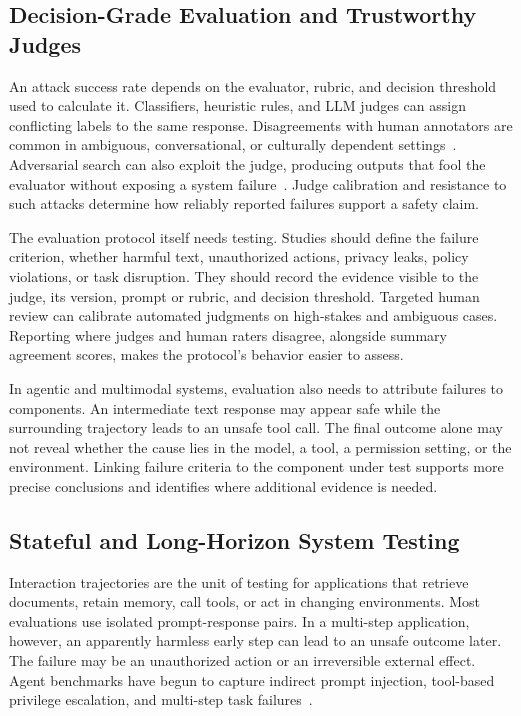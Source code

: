 \documentclass[review]{fcs}
\let\fcsOriginalCite\cite
\renewcommand{\cite}[1]{\allowbreak\fcsOriginalCite{#1}}
\begin{document}
\subsection{Decision-Grade Evaluation and Trustworthy Judges}
\label{sec:agenda_judges}

An attack success rate depends on the evaluator, rubric, and decision threshold used to calculate it. Classifiers, heuristic rules, and LLM judges can assign conflicting labels to the same response. Disagreements with human annotators are common in ambiguous, conversational, or culturally dependent settings~\cite{souly2024strongreject,han2024wildguard,inan2023llamaguard,zheng2023mtbench,chen2024humansjudge,thakur2025judgingjudges,chen2025saferluckier,eiras2025knowthyjudge,NEURIPS2023_a74b697b,mostafazadeh-davani-etal-2024-d3code}. Adversarial search can also exploit the judge, producing outputs that fool the evaluator without exposing a system failure~\cite{raina2024robustjudge,tong2025badjudge,shi2024optimization}. Judge calibration and resistance to such attacks determine how reliably reported failures support a safety claim.

The evaluation protocol itself needs testing. Studies should define the failure criterion, whether harmful text, unauthorized actions, privacy leaks, policy violations, or task disruption. They should record the evidence visible to the judge, its version, prompt or rubric, and decision threshold. Targeted human review can calibrate automated judgments on high-stakes and ambiguous cases. Reporting where judges and human raters disagree, alongside summary agreement scores, makes the protocol's behavior easier to assess.

In agentic and multimodal systems, evaluation also needs to attribute failures to components. An intermediate text response may appear safe while the surrounding trajectory leads to an unsafe tool call. The final outcome alone may not reveal whether the cause lies in the model, a tool, a permission setting, or the environment. Linking failure criteria to the component under test supports more precise conclusions and identifies where additional evidence is needed.

\subsection{Stateful and Long-Horizon System Testing}
\label{sec:agenda_stateful}

Interaction trajectories are the unit of testing for applications that retrieve documents, retain memory, call tools, or act in changing environments. Most evaluations use isolated prompt-response pairs. In a multi-step application, however, an apparently harmless early step can lead to an unsafe outcome later. The failure may be an unauthorized action or an irreversible external effect. Agent benchmarks have begun to capture indirect prompt injection, tool-based privilege escalation, and multi-step task failures~\cite{debenedetti2024agentdojo,zhan2024injecagent,ruan2024toolemu,chen2024agentpoison,zou2025poisonedrag,wang2025webinject}.
\end{document}
